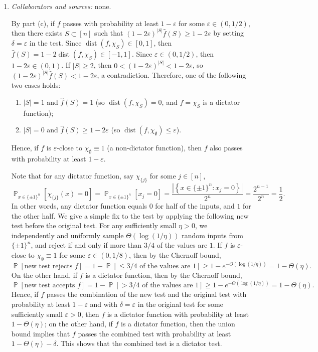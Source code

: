\documentclass[letterpaper, reqno,11pt]{article}
\newcommand{\PP}{\mathop{{}\mathbb{P}}}
\DeclareMathOperator{\dist}{dist}
\begin{document}
\begin{enumerate}
\begin{enumerate}
    \clearpage

    \item \noindent\emph{Collaborators and sources:} none.
    
    By part (c), if $f$ passes with probability at least $1 - \varepsilon$ for some $\varepsilon \in (0, 1/2)$, then there exists $S \subset [n]$ such that $(1 - 2\varepsilon)^{|S|} \hat{f}(S) \geq 1 - 2\varepsilon$ by setting $\delta = \varepsilon$ in the test. Since $\dist(f, \chi_S) \in [0, 1]$, then $\hat{f}(S) = 1 - 2\dist(f, \chi_S) \in [-1, 1]$. Since $\varepsilon \in (0, 1/2)$, then $1 - 2\varepsilon \in (0, 1)$. If $|S| \geq 2$, then $0 < (1 - 2\varepsilon)^{|S|} < 1 - 2\varepsilon$, so $(1 - 2\varepsilon)^{|S|} \hat{f}(S) < 1 - 2\varepsilon$, a contradiction. Therefore, one of the following two cases holds:
    \begin{enumerate}[label=(\roman*), itemsep=0pt]
      \item $|S| = 1$ and $\hat{f}(S) = 1$ (so $\dist(f, \chi_S) = 0$, and $f = \chi_S$ is a dictator function);
      \item $|S| = 0$ and $\hat{f}(S) \geq 1 - 2\varepsilon$ (so $\dist(f, \chi_\emptyset) \leq \varepsilon$).
    \end{enumerate}
    Hence, if $f$ is $\varepsilon$-close to $\chi_\emptyset \equiv 1$ (a non-dictator function), then $f$ also passes with probability at least $1 - \varepsilon$.

    Note that for any dictator function, say $\chi_{\{ j \}}$ for some $j \in [n]$,
    $$ \PP_{x \in \{ \pm 1 \}^n}\left[\chi_{\{ j \}}(x) = 0\right] = \PP_{x \in \{ \pm 1 \}^n}\left[x_j = 0\right] = \frac{\left|\left\{ x \in \{ \pm 1 \}^n : x_j = 0 \right\}\right|}{2^n} = \frac{2^{n - 1}}{2^n} = \frac{1}{2}. $$
    In other words, any dictator function equals $0$ for half of the inputs, and $1$ for the other half. We give a simple fix to the test by applying the following new test before the original test. For any sufficiently small $\eta > 0$, we independently and uniformly sample $\Theta(\log (1/\eta))$ random inputs from $\{ \pm 1 \}^n$, and reject if and only if more than $3/4$ of the values are $1$. If $f$ is $\varepsilon$-close to $\chi_\emptyset \equiv 1$ for some $\varepsilon \in (0, 1/8)$, then by the Chernoff bound,
    $$ \PP[\text{new test rejects $f$}] = 1 - \PP[\text{$\leq 3/4$ of the values are $1$}] \geq 1 - e^{-\Theta(\log (1/\eta))} = 1 - \Theta(\eta). $$
    On the other hand, if $f$ is a dictator function, then by the Chernoff bound,
    $$ \PP[\text{new test accepts $f$}] = 1 - \PP[\text{$>3/4$ of the values are $1$}] \geq 1 - e^{-\Theta(\log(1/\eta))} = 1 - \Theta(\eta). $$
    Hence, if $f$ passes the combination of the new test and the original test with probability at least $1 - \varepsilon$ and with $\delta = \varepsilon$ in the original test for some sufficiently small $\varepsilon > 0$, then $f$ is a dictator function with probability at least $1 - \Theta(\eta)$; on the other hand, if $f$ is a dictator function, then the union bound implies that $f$ passes the combined test with probability at least $1 - \Theta(\eta) - \delta$. This shows that the combined test is a dictator test.
  \end{enumerate}
\end{enumerate}
\end{document}
